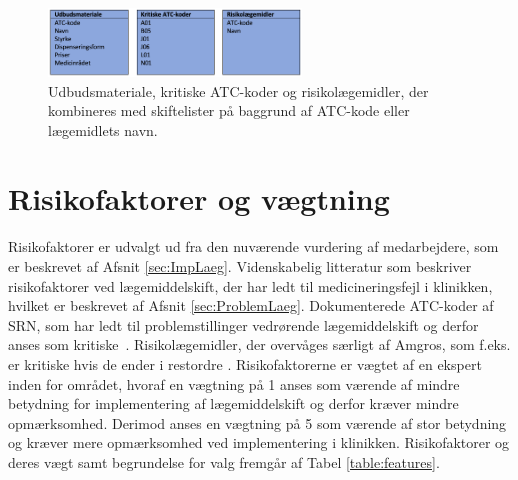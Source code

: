 \vspace{0.2cm}
\begin{figure}[H]\centering
\includegraphics[width=0.6\textwidth]{billeder/Input2.png} 
	\caption{Udbudsmateriale, kritiske ATC-koder og risikolægemidler, der kombineres med skiftelister på baggrund af ATC-kode eller lægemidlets navn.}
	\label{fig:Input2}  
\end{figure}

\section{Risikofaktorer og vægtning}
Risikofaktorer er udvalgt ud fra den nuværende vurdering af medarbejdere, som er beskrevet af Afsnit \ref{sec:ImpLaeg}. Videnskabelig litteratur som beskriver risikofaktorer ved lægemiddelskift, der har ledt til medicineringsfejl i klinikken, hvilket er beskrevet af Afsnit \ref{sec:ProblemLaeg}. Dokumenterede ATC-koder af SRN, som har ledt til problemstillinger vedrørende lægemiddelskift og derfor anses som kritiske~\citep{SRN}. Risikolægemidler, der overvåges særligt af Amgros, som f.eks. er kritiske hvis de ender i restordre \citep{Amgros}. Risikofaktorerne er vægtet af en ekspert inden for området, hvoraf en vægtning på 1 anses som værende af mindre betydning for implementering af lægemiddelskift og derfor kræver mindre opmærksomhed. Derimod anses en vægtning på 5 som værende af stor betydning og kræver mere opmærksomhed ved implementering i klinikken.
Risikofaktorer og deres vægt samt begrundelse for valg fremgår af Tabel \ref{table:features}.


